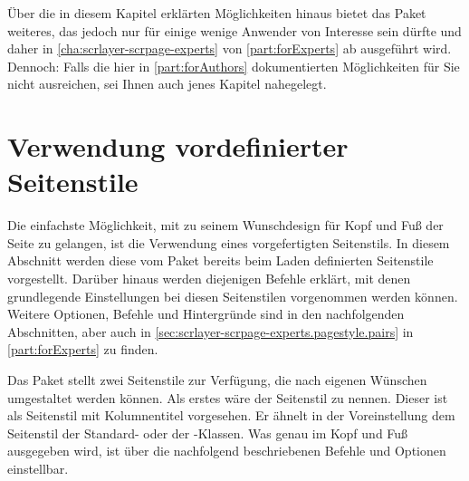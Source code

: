 Über die in diesem Kapitel erklärten Möglichkeiten hinaus bietet das Paket
 weiteres, das jedoch nur für einige wenige
Anwender von Interesse sein dürfte und daher in
\autoref{cha:scrlayer-scrpage-experts} von \autoref{part:forExperts} ab
 ausgeführt wird. Dennoch: Falls die
hier in \autoref{part:forAuthors} dokumentierten Möglichkeiten für Sie nicht
ausreichen, sei Ihnen auch jenes Kapitel nahegelegt.




\section{Verwendung vordefinierter Seitenstile}

Die einfachste Möglichkeit, mit  zu seinem
Wunschdesign für Kopf und Fuß der Seite zu gelangen, ist die Verwendung eines
vorgefertigten Seitenstils.
%
\iftrue %
  In diesem Abschnitt werden diese vom Paket  bereits
  beim Laden definierten Seitenstile vorgestellt. Darüber hinaus werden
  diejenigen Befehle erklärt, mit denen grundlegende Einstellungen bei diesen
  Seitenstilen vorgenommen werden können. Weitere Optionen, Befehle und
  Hintergründe sind in den nachfolgenden Abschnitten, aber auch in
  \autoref{sec:scrlayer-scrpage-experts.pagestyle.pairs} in
  \autoref{part:forExperts} zu finden.%
\fi

\begin{Declaration}
\end{Declaration}
Das Paket  stellt zwei Seitenstile zur Verfügung,
die nach eigenen Wünschen umgestaltet werden können. Als erstes wäre der
Seitenstil  zu
nennen. Dieser ist als Seitenstil mit Kolumnentitel vorgesehen. Er ähnelt in
der Voreinstellung dem Seitenstil
 der Standard-
oder der \KOMAScript-Klassen. Was genau im Kopf und Fuß ausgegeben wird, ist
über die nachfolgend beschriebenen Befehle und Optionen einstellbar.

